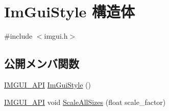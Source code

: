 \hypertarget{struct_im_gui_style}{}\section{Im\+Gui\+Style 構造体}
\label{struct_im_gui_style}


{\ttfamily \#include $<$imgui.\+h$>$}

\subsection*{公開メンバ関数}
\begin{DoxyCompactItemize}
\item 
\mbox{\hyperlink{imgui_8h_a43829975e84e45d1149597467a14bbf5}{I\+M\+G\+U\+I\+\_\+\+A\+PI}} \mbox{\hyperlink{struct_im_gui_style_ab0a3ffb3aeec3e6b09b9bde812b28369}{Im\+Gui\+Style}} ()
\item 
\mbox{\hyperlink{imgui_8h_a43829975e84e45d1149597467a14bbf5}{I\+M\+G\+U\+I\+\_\+\+A\+PI}} void \mbox{\hyperlink{struct_im_gui_style_a7c9d3e0974a239f65e433cc952be0627}{Scale\+All\+Sizes}} (float scale\+\_\+factor)
\end{DoxyCompactItemize}
